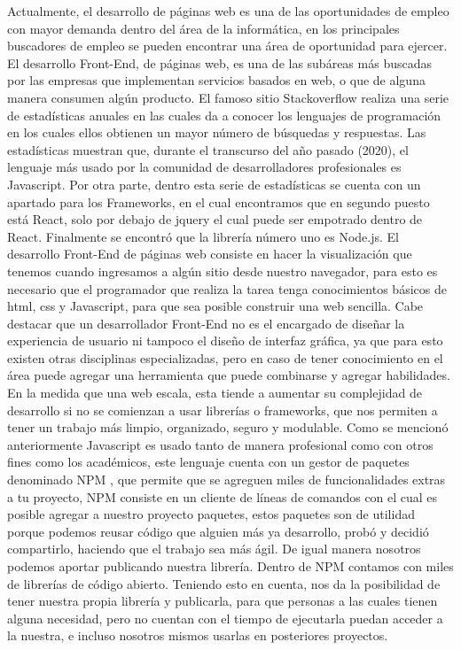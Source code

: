 Actualmente, el desarrollo de páginas web es una de las oportunidades de empleo con mayor demanda dentro del área de la informática, en los principales buscadores de empleo  \cite{work} se pueden encontrar una área de oportunidad para ejercer. El desarrollo Front-End, de páginas web, es una de las subáreas más buscadas por las empresas que implementan servicios basados en web, o que de alguna manera consumen algún producto. 
El famoso sitio Stackoverflow  \cite{stackOverflow}realiza una serie de estadísticas anuales en las cuales da a conocer los lenguajes de programación en los cuales ellos obtienen un mayor número de búsquedas y respuestas. Las estadísticas muestran que, durante el transcurso del año pasado (2020), el lenguaje más usado por la comunidad de desarrolladores profesionales es Javascript. 
Por otra parte, dentro esta serie de estadísticas se cuenta con un apartado para los Frameworks, en el cual encontramos que en segundo puesto está React, solo por debajo de jquery el cual puede ser empotrado dentro de React.  Finalmente se encontró que la librería número uno es Node.js. 
El desarrollo Front-End  \cite{frontEnd}de páginas web consiste en hacer la visualización que tenemos cuando ingresamos a algún sitio desde nuestro navegador, para esto es necesario que el programador que realiza la tarea tenga conocimientos básicos de html, css y Javascript, para que sea posible construir una web sencilla. Cabe destacar que un desarrollador Front-End no es el encargado de diseñar la experiencia de usuario ni tampoco el diseño de interfaz gráfica, ya que para esto existen otras disciplinas especializadas, pero en caso de tener conocimiento en el área puede agregar una herramienta que puede combinarse y agregar habilidades.
\newline
En la medida que una web escala, esta tiende a aumentar su complejidad de desarrollo si no se comienzan a usar librerías o frameworks, que nos permiten a tener un trabajo más limpio, organizado, seguro y modulable. 
Como se mencionó anteriormente Javascript es usado tanto de manera profesional como con otros fines como los académicos, este lenguaje cuenta con un gestor de paquetes denominado NPM  \cite{npm},  que permite que se agreguen miles de funcionalidades extras a tu proyecto, NPM consiste en un cliente de líneas de comandos con el cual es posible agregar a nuestro proyecto paquetes, estos paquetes son de utilidad porque podemos reusar código que alguien más ya desarrollo, probó y decidió compartirlo, haciendo que el trabajo sea más ágil.  De igual manera nosotros podemos aportar publicando nuestra librería. Dentro de NPM contamos con miles de librerías de código abierto.  
Teniendo esto en cuenta, nos da la posibilidad de tener nuestra propia librería y publicarla, para que personas a las cuales tienen alguna necesidad, pero no cuentan con el tiempo de ejecutarla puedan acceder a la nuestra, e incluso nosotros mismos usarlas en posteriores proyectos. 

